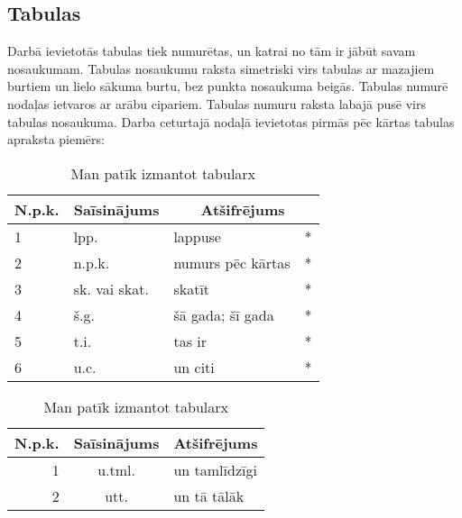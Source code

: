 \subsection{Tabulas}
Darbā ievietotās tabulas tiek numurētas, un katrai no tām ir jābūt savam
nosaukumam. Tabulas nosaukumu raksta simetriski virs tabulas ar mazajiem burtiem
un lielo sākuma burtu, bez punkta nosaukuma beigās. Tabulas numurē nodaļas
ietvaros ar arābu cipariem. Tabulas numuru raksta labajā pusē virs tabulas
nosaukuma. Darba ceturtajā nodaļā ievietotas pirmās pēc kārtas tabulas apraksta
piemērs:\\
%
	\begin{table}[!th]
	\begin{center}
		 \begin{tabularx}{\textwidth}{|m{1.5cm}|m{4.8cm}|X|X|}
		  \hline 
		  \textbf{N.p.k.} & \textbf{Saīsinājums} &  \multicolumn{2}{c|}{\textbf{Atšifrējums}} \\ 
		  \hline 
		  \hline 
		 1 & lpp. &  lappuse  & * \\ 
		  \hline 
		  2   & n.p.k. &  numurs pēc kārtas  & * \\ 
		  \hline 
		  3 & sk. vai skat. &  skatīt  & * \\ 
		  \hline 
		  4 & š.g. &  šā gada; šī gada  & * \\ 
		  \hline 
		  5 & t.i. &  tas ir & *  \\ 
		  \hline 
		  6 & u.c. &  un citi & *  \\ 
		  \hline 
		  \end{tabularx}  
		\caption{Man patīk izmantot tabularx}\label{tab:piemers1}
	\end{center}
	\end{table}
%
	\begin{table}[!th]
	\begin{center}
		 \begin{tabularx}{\textwidth}{|r|c|X|}
		  \hline 
		  \textbf{N.p.k.} & \textbf{Saīsinājums} & 	  \textbf{Atšifrējums} \\ 
		  \hline 
		  \hline 
		 1 & u.tml. &  un tamlīdzīgi   \\ 
		  \hline 
		  2   & utt. &  un tā tālāk  \\ 
		  \hline 
		  \end{tabularx}  
		\caption{Man patīk izmantot tabularx}\label{tab:piemers2}
	\end{center}
	\end{table}

